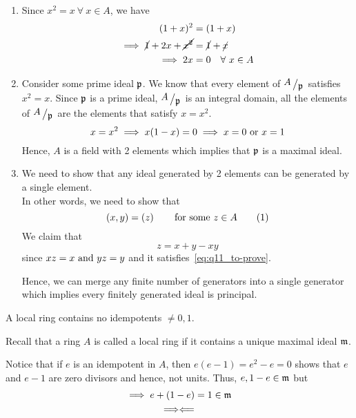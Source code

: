 \begin{enumerate}
	\item
	Since \(x^2 = x \ \forall\ x \in A\), we have
	\begin{align*}
		(1+x)^2 &= (1+x) \\
		\implies \cancel{1} + 2x + \cancel{x^2} &= \cancel{1} + \cancel{x} \\
		\implies 2x &= 0 \quad \forall\ x \in A
	\end{align*}

	\item
	Consider some prime ideal \(\mathfrak{p}\).
	We know that every element of \(\bigslant{A}{\mfp}\) satisfies
	\(x^2 = x\).
	Since \(\mathfrak{p}\) is a prime ideal, \(\bigslant{A}{\mfp}\) is an
	integral domain, all the elements of \(\bigslant{A}{\mfp}\) are
	the elements that satisfy \(x = x^2\).
	\[
		x = x^2 \implies x(1-x) = 0 \implies x = 0 \text{ or } x = 1
	\]
	Hence, \(A\) is a field with 2 elements which implies that
	\(\mathfrak{p}\) is a maximal ideal.

	\item
	We need to show that any ideal generated by 2 elements
	can be generated by a single element. \\
	In other words, we need to show that
	\[
		\brak{x, y} = \brak{z} \quad\quad
		\text{for some } z \in A
		\numberthis \label{eq:q11_to-prove}
	\]
	We claim that
	\[
		z = x + y - xy
	\]
	since \(xz = x \text{ and } yz = y\) and it satisfies~\eqref{eq:q11_to-prove}.

	Hence, we can merge any finite number of generators into a single
	generator which implies every finitely generated ideal is principal.
\end{enumerate}


\begin{exercise}{}{}
	A local ring contains no idempotents \(\neq 0, 1\).
\end{exercise}

Recall that a ring \(A\) is called a local ring if it contains a unique
maximal ideal \(\mathfrak{m}\).


Notice that if \(e\) is an idempotent in \(A\), then \(e(e-1) = e^2 - e = 0\)
shows that \(e\) and \(e-1\) are zero divisors and hence, not units.
Thus, \(e, 1-e \in \mathfrak{m}\) but
\begin{gather*}
	\implies e + (1-e) = 1 \in \mathfrak{m} \\
	\Longrightarrow \Longleftarrow
\end{gather*}
